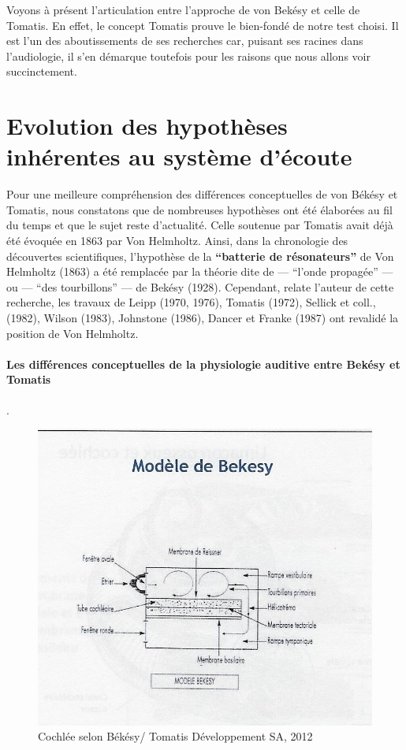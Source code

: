 Voyons à présent l'articulation entre l'approche de von Bekésy et celle de Tomatis.
En effet, le concept Tomatis prouve le bien-fondé de notre  test choisi.
Il est l'un des aboutissements de
ses recherches car, puisant  ses racines dans l'audiologie, il s'en
démarque toutefois pour les raisons que nous allons voir succinctement.

\section{Evolution des hypothèses inhérentes au système d'écoute}
Pour une meilleure compréhension des différences conceptuelles de von Békésy et Tomatis, nous 
constatons que de nombreuses  hypothèses ont été élaborées au fil du temps et que le sujet reste 
d'actualité.  Celle soutenue par Tomatis  avait déjà été évoquée en 1863 par Von Helmholtz. 
Ainsi, dans la chronologie des découvertes scientifiques,  l'hypothèse de la \textbf{``batterie de
	résonateurs''}  de Von Helmholtz (1863)  a été remplacée par la
théorie dite de  --- ``l'onde propagée'' --- ou --- ``des
tourbillons'' ---  de Bekésy (1928).
Cependant, relate l'auteur de cette recherche, les travaux de Leipp (1970, 1976), Tomatis (1972), Sellick 
et coll.,(1982), Wilson (1983),
Johnstone (1986), Dancer et
Franke (1987) ont revalidé la position de Von Helmholtz.\autocite[p 24---28,
ch. 1]{auriol:cle}

\paragraph{Les différences conceptuelles de la physiologie auditive
  entre Bekésy et Tomatis}.

\begin{figure}
	\centering
	\includegraphics[width=1.0\linewidth]{images/Cochleederoule_bas.jpg}
	\caption[Modèle de Békésy]{Cochlée selon Békésy/ Tomatis Développement SA, 2012}
	\label{fig:cochleederoulebas}
\end{figure}


